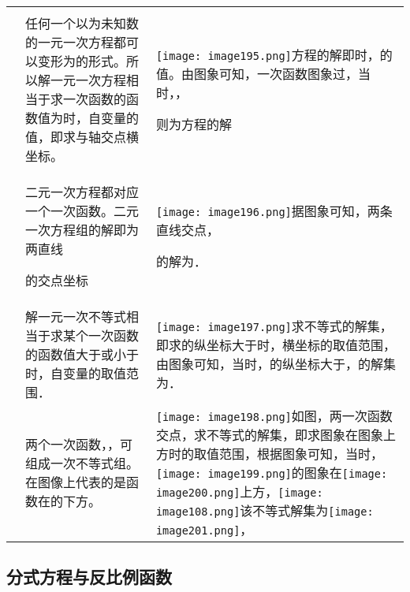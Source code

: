 \begin{longtable}[]{@{}lll@{}}
\toprule
\endhead
& &\tabularnewline
\begin{minipage}[t]{0.30\columnwidth}\raggedright
\strut
\end{minipage} & \begin{minipage}[t]{0.30\columnwidth}\raggedright
任何一个以为未知数的一元一次方程都可以变形为的形式。所以解一元一次方程相当于求一次函数的函数值为时，自变量的值，即求与轴交点横坐标。\strut
\end{minipage} & \begin{minipage}[t]{0.30\columnwidth}\raggedright
\texttt{[image: image195.png]}方程的解即时，的值。由图象可知，一次函数图象过，当时，，

则为方程的解\strut
\end{minipage}\tabularnewline
\begin{minipage}[t]{0.30\columnwidth}\raggedright
\strut
\end{minipage} & \begin{minipage}[t]{0.30\columnwidth}\raggedright
二元一次方程都对应一个一次函数。二元一次方程组的解即为两直线

的交点坐标\strut
\end{minipage} & \begin{minipage}[t]{0.30\columnwidth}\raggedright
\texttt{[image: image196.png]}据图象可知，两条直线交点，

的解为．\strut
\end{minipage}\tabularnewline
&
解一元一次不等式相当于求某个一次函数的函数值大于或小于时，自变量的取值范围．
&
\texttt{[image: image197.png]}求不等式的解集，即求的纵坐标大于时，横坐标的取值范围，由图象可知，当时，的纵坐标大于，的解集为．\tabularnewline
& 两个一次函数，，可组成一次不等式组。在图像上代表的是函数在的下方。 &
\texttt{[image: image198.png]}如图，两一次函数交点，求不等式的解集，即求图象在图象上方时的取值范围，根据图象可知，当时，\texttt{[image: image199.png]}的图象在\texttt{[image: image200.png]}上方，\texttt{[image: image108.png]}该不等式解集为\texttt{[image: image201.png]}，\tabularnewline
\bottomrule
\end{longtable}

\hypertarget{ux5206ux5f0fux65b9ux7a0bux4e0eux53cdux6bd4ux4f8bux51fdux6570}{%
\subsection{\texorpdfstring{
分式方程与反比例函数}{ 分式方程与反比例函数}}\label{ux5206ux5f0fux65b9ux7a0bux4e0eux53cdux6bd4ux4f8bux51fdux6570}}

